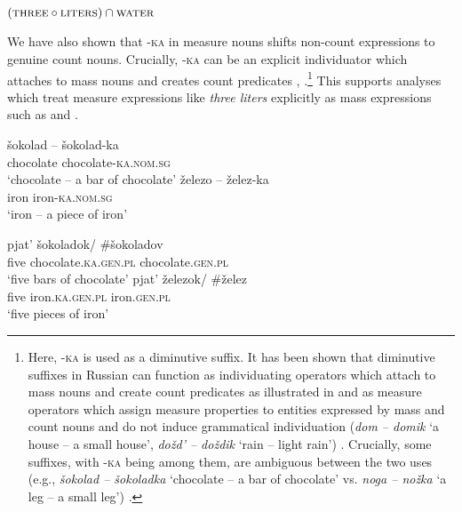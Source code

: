 \documentclass[output=paper,
colorlinks,
citecolor=brown,
newtxmath
]{langscibook}
\begin{document}
\ea\label{ex:41} $(\textsc{three}\circ\textsc{liters}) \cap\textsc{water}$
\z

\noindent We have also shown that -\textsc{ka} in measure nouns shifts non-count expressions to genuine count nouns. Crucially, -\textsc{ka} can be an explicit individuator which attaches to mass nouns and creates count predicates \citep{Khrizman2017} , .\footnote{Here, -\textsc{ka} is used as a diminutive suffix. It has been shown that diminutive suffixes in Russian can function as individuating operators which attach to mass nouns and create count predicates as illustrated in  and as measure operators which assign measure properties to entities expressed by mass and count nouns and do not induce grammatical individuation (\textit{dom -- domik} `a house -- a small house', \textit{\textit{dožd' -- doždik}} `rain -- light rain') \citep{Khrizman2017,Khrizman2019}. Crucially, some suffixes, with -\textsc{ka} being among them, are ambiguous between the two uses (e.g., \textit{šokolad -- šokoladka} `chocolate -- a bar of chocolate' vs. \textit{noga -- nožka} `a leg -- a small leg') \citep{Khrizman2019}.} This supports analyses which treat measure expressions like \textit{three liters} explicitly as mass expressions such as \citet{Khrizman.etal2015} and \citet{Landman2016}.

\begin{exe}
\ex\label{ex:42}
       \begin{xlist}
           \ex\label{ex:42a} \gll šokolad -- šokolad-ka\\
          chocolate {}{} chocolate-\textsc{ka.nom.sg}\\
\glt `chocolate -- a bar of chocolate'
          \ex\label{ex:42b} \gll železo -- želez-ka\\
            iron {}{} iron-\textsc{ka.nom.sg}\\
            \glt `iron -- a piece of iron'\\
        \end{xlist}
\end{exe}


\begin{exe}
\ex\label{ex:43}
       \begin{xlist}
            \ex\label{ex:43a} \gll pjat' šokoladok/ \#šokoladov\\
            five chocolate.\textsc{ka.gen.pl} \phantom{\#}chocolate.\textsc{gen.pl}\\
           \glt `five bars of chocolate'
           \ex\label{ex:43b} \gll pjat' železok/ \#želez\\
            five iron.\textsc{ka.gen.pl} \phantom{\#}iron.\textsc{gen.pl}\\
           \glt `five pieces of iron'\\
       \end{xlist}
\end{exe}
\end{document}
